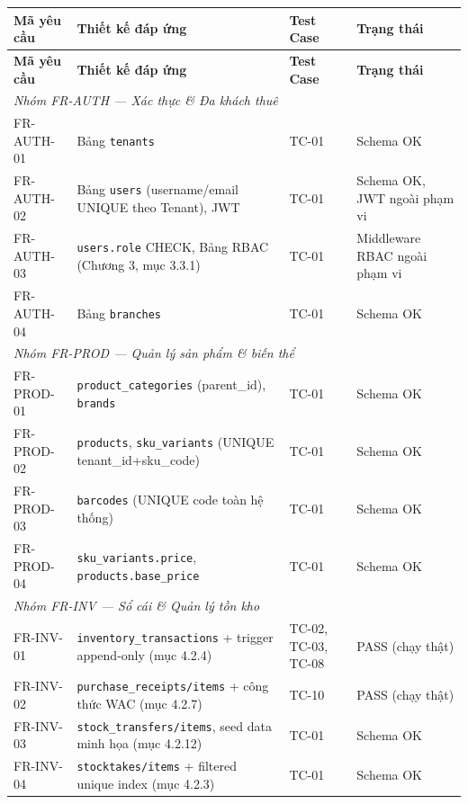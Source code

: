\begin{longtable}{|p{2.1cm}|p{5.2cm}|p{3.3cm}|p{2.6cm}|}
\hline
\textbf{Mã yêu cầu} & \textbf{Thiết kế đáp ứng} & \textbf{Test Case} & \textbf{Trạng thái} \\
\hline
\endfirsthead
\hline
\textbf{Mã yêu cầu} & \textbf{Thiết kế đáp ứng} & \textbf{Test Case} & \textbf{Trạng thái} \\
\hline
\endhead

\multicolumn{4}{|l|}{\textit{Nhóm FR-AUTH — Xác thực \& Đa khách thuê}} \\ \hline
FR-AUTH-01 & Bảng \texttt{tenants} & TC-01 & Schema OK \\ \hline
FR-AUTH-02 & Bảng \texttt{users} (username/email UNIQUE theo Tenant), JWT & TC-01 & Schema OK, JWT ngoài phạm vi \\ \hline
FR-AUTH-03 & \texttt{users.role} CHECK, Bảng RBAC (Chương 3, mục 3.3.1) & TC-01 & Middleware RBAC ngoài phạm vi \\ \hline
FR-AUTH-04 & Bảng \texttt{branches} & TC-01 & Schema OK \\ \hline

\multicolumn{4}{|l|}{\textit{Nhóm FR-PROD — Quản lý sản phẩm \& biến thể}} \\ \hline
FR-PROD-01 & \texttt{product\_categories} (parent\_id), \texttt{brands} & TC-01 & Schema OK \\ \hline
FR-PROD-02 & \texttt{products}, \texttt{sku\_variants} (UNIQUE tenant\_id+sku\_code) & TC-01 & Schema OK \\ \hline
FR-PROD-03 & \texttt{barcodes} (UNIQUE code toàn hệ thống) & TC-01 & Schema OK \\ \hline
FR-PROD-04 & \texttt{sku\_variants.price}, \texttt{products.base\_price} & TC-01 & Schema OK \\ \hline

\multicolumn{4}{|l|}{\textit{Nhóm FR-INV — Sổ cái \& Quản lý tồn kho}} \\ \hline
FR-INV-01 & \texttt{inventory\_transactions} + trigger append-only (mục 4.2.4) & TC-02, TC-03, TC-08 & PASS (chạy thật) \\ \hline
FR-INV-02 & \texttt{purchase\_receipts/items} + công thức WAC (mục 4.2.7) & TC-10 & PASS (chạy thật) \\ \hline
FR-INV-03 & \texttt{stock\_transfers/items}, seed data minh họa (mục 4.2.12) & TC-01 & Schema OK \\ \hline
FR-INV-04 & \texttt{stocktakes/items} + filtered unique index (mục 4.2.3) & TC-01 & Schema OK \\ \hline


\end{longtable}
